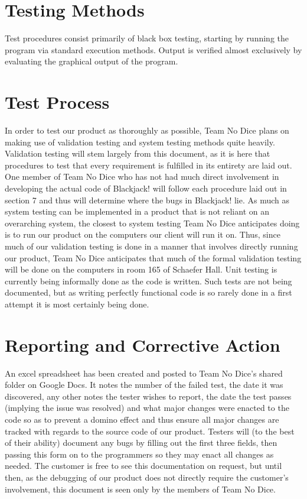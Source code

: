 \documentclass{article}
\begin{document}
\section{Testing Methods}
Test procedures consist primarily of black box testing, starting by running the program via standard execution methods.  Output is verified almost exclusively by evaluating the graphical output of the program.

\section{Test Process}

In order to test our product as thoroughly as possible, Team No Dice plans on making use of validation testing and system testing methods quite heavily.  Validation testing will stem largely from this document, as it is here that procedures to test that every requirement is fulfilled in its entirety are laid out.  One member of Team No Dice who has not had much direct involvement in developing the actual code of Blackjack! will follow each procedure laid out in section 7 and thus will determine where the bugs in Blackjack! lie.  As much as system testing can be implemented in a product that is not reliant on an overarching system, the closest to system testing Team No Dice anticipates doing is to run our product on the computers our client will run it on.  Thus, since much of our validation testing is done in a manner that involves directly running our product, Team No Dice anticipates that much of the formal validation testing will be done on the computers in room 165 of Schaefer Hall.  Unit testing is currently being informally done as the code is written.  Such tests are not being documented, but as writing perfectly functional code is so rarely done in a first attempt it is most certainly being done.  

\section{Reporting and Corrective Action}

An excel spreadsheet has been created and posted to Team No Dice’s shared folder on Google Docs.  It notes the number of the failed test, the date it was discovered, any other notes the tester wishes to report, the date the test passes (implying the issue was resolved) and what major changes were enacted to the code so as to prevent a domino effect and thus ensure all major changes are tracked with regards to the source code of our product.  Testers will (to the best of their ability) document any bugs by filling out the first three fields, then passing this form on to the programmers so they may enact all changes as needed.  The customer is free to see this documentation on request, but until then, as the debugging of our product does not directly require the customer’s involvement, this document is seen only by the members of Team No Dice.  
\end{document}
